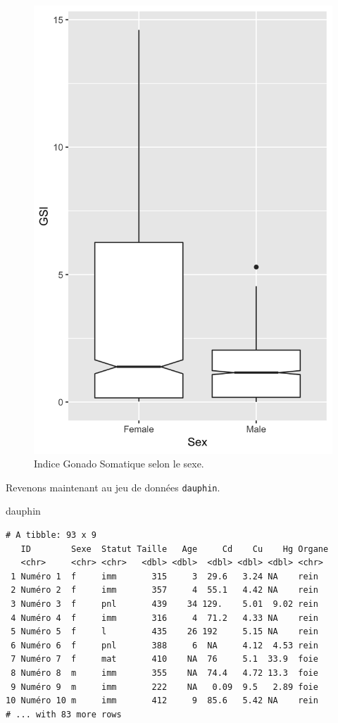 \documentclass[a4paperpaper,]{article}
\newenvironment{Shaded}{\begin{snugshade}}{\end{snugshade}}
\newcommand{\NormalTok}[1]{\textcolor[rgb]{0.12,0.11,0.11}{#1}}
\theoremstyle{definition}
\theoremstyle{definition}
\theoremstyle{definition}
\theoremstyle{remark}
\begin{document}
\begin{figure}[htpb]

{\centering \includegraphics[width=0.5\linewidth]{figure/unnamed-chunk-140-1} 

}

\caption{Indice Gonado Somatique  selon le sexe.}\label{fig:unnamed-chunk-140}
\end{figure}

Revenons maintenant au jeu de données \texttt{dauphin}.

\begin{Shaded}
\begin{Highlighting}[]
\NormalTok{dauphin}
\end{Highlighting}
\end{Shaded}

\begin{verbatim}
# A tibble: 93 x 9
   ID        Sexe  Statut Taille   Age     Cd    Cu    Hg Organe
   <chr>     <chr> <chr>   <dbl> <dbl>  <dbl> <dbl> <dbl> <chr> 
 1 Numéro 1  f     imm       315     3  29.6   3.24 NA    rein  
 2 Numéro 2  f     imm       357     4  55.1   4.42 NA    rein  
 3 Numéro 3  f     pnl       439    34 129.    5.01  9.02 rein  
 4 Numéro 4  f     imm       316     4  71.2   4.33 NA    rein  
 5 Numéro 5  f     l         435    26 192     5.15 NA    rein  
 6 Numéro 6  f     pnl       388     6  NA     4.12  4.53 rein  
 7 Numéro 7  f     mat       410    NA  76     5.1  33.9  foie  
 8 Numéro 8  m     imm       355    NA  74.4   4.72 13.3  foie  
 9 Numéro 9  m     imm       222    NA   0.09  9.5   2.89 foie  
10 Numéro 10 m     imm       412     9  85.6   5.42 NA    rein  
# ... with 83 more rows
\end{verbatim}
\end{document}
